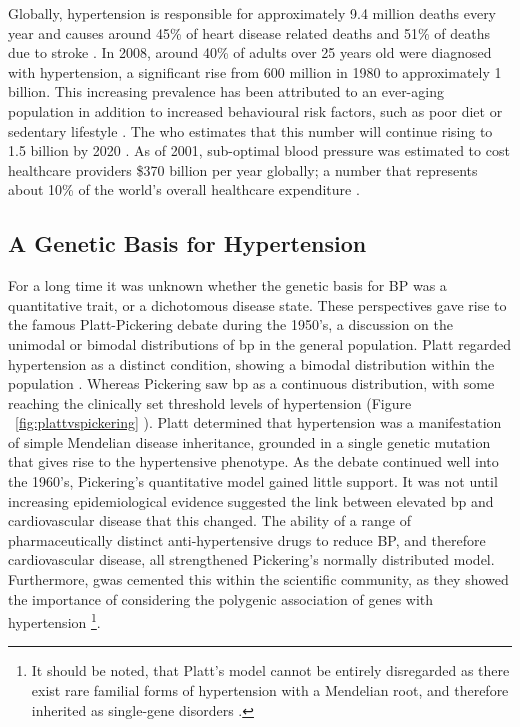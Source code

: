 Globally, hypertension is responsible for approximately 9.4 million deaths every year and causes around 45\% of heart disease related deaths and 51\% of deaths due to stroke \cite{WHO}. In 2008, around 40\% of adults over 25 years old were diagnosed with hypertension, a significant rise from 600 million in 1980 to approximately 1 billion. This increasing prevalence has been attributed to an ever-aging population in addition to increased behavioural risk factors, such as poor diet or sedentary lifestyle \cite{WHO2013}. The \acrfull{who} estimates that this number will continue rising to 1.5 billion by 2020 \cite{Kearney2005}. As of 2001, sub-optimal blood pressure was estimated to cost healthcare providers \$370 billion per year globally; a number that represents about 10\% of the world's overall healthcare expenditure \cite{Gaziano2009}. 

\subsection{A Genetic Basis for Hypertension}

For a long time it was unknown whether the genetic basis for BP was a quantitative trait, or a dichotomous disease state. These perspectives gave rise to the famous Platt-Pickering debate during the 1950's, a discussion on the unimodal or bimodal distributions of \acrshort{bp} in the general population. Platt regarded hypertension as a distinct condition, showing a bimodal distribution within the population \cite{PLATT1947}. Whereas Pickering saw \acrshort{bp} as a continuous distribution, with some reaching the clinically set threshold levels of hypertension (Figure ~\ref{fig:plattvspickering} \cite{Pickering1959}). Platt determined that hypertension was a manifestation of simple Mendelian disease inheritance, grounded in a single genetic mutation that gives rise to the hypertensive phenotype. As the debate continued well into the 1960's, Pickering's quantitative model gained little support. It was not until increasing epidemiological evidence suggested the link between elevated \acrshort{bp} and cardiovascular disease that this changed. The ability of a range of pharmaceutically distinct anti-hypertensive drugs to reduce BP, and therefore cardiovascular disease, all strengthened Pickering's normally distributed model. Furthermore, \acrfull{gwas} cemented this within the scientific community, as they showed the importance of considering the polygenic association of genes with hypertension \cite{Ehret2011,Kato2011,Levy2009} \footnote[2]{It should be noted, that Platt's model cannot be entirely disregarded as there exist rare familial forms of hypertension with a Mendelian root, and therefore inherited as single-gene disorders \cite{Lifton2001}.}.

